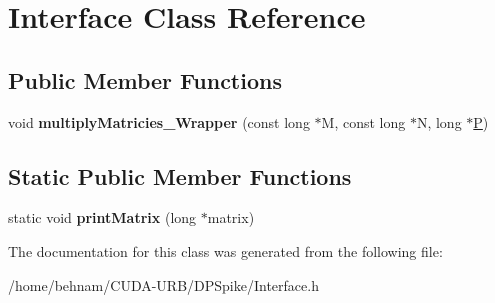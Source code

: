 \hypertarget{classInterface}{}\section{Interface Class Reference}
\label{classInterface}
\subsection*{Public Member Functions}
\begin{DoxyCompactItemize}
\item 
\mbox{\label{classInterface_ace59d7a5b7ea7e6ba10d7297d8770c6b}} 
void {\bfseries multiply\+Matricies\+\_\+\+Wrapper} (const long $\ast$M, const long $\ast$N, long $\ast$\hyperlink{classP}{P})
\end{DoxyCompactItemize}
\subsection*{Static Public Member Functions}
\begin{DoxyCompactItemize}
\item 
\mbox{\label{classInterface_a8a77ff35f314bb84e55d05d651cc0417}} 
static void {\bfseries print\+Matrix} (long $\ast$matrix)
\end{DoxyCompactItemize}


The documentation for this class was generated from the following file\+:\begin{DoxyCompactItemize}
\item 
/home/behnam/\+C\+U\+D\+A-\/\+U\+R\+B/\+D\+P\+Spike/Interface.\+h\end{DoxyCompactItemize}
